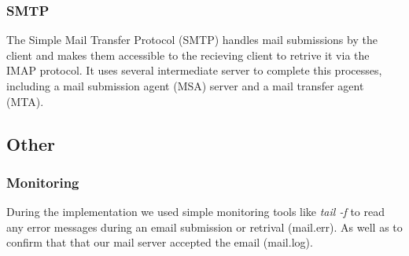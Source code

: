 \subsubsection{SMTP}
The Simple Mail Transfer Protocol (SMTP) handles mail submissions by the
client and makes them accessible to the recieving client to retrive it
via the IMAP protocol. It uses several intermediate server to complete
this processes, including a mail submission agent (MSA) server and a
mail transfer agent (MTA).
\subsection{Other}
\subsubsection{Monitoring}
During the implementation we used simple monitoring tools like \emph{tail -f} 
to read any error messages during an email submission or retrival (mail.err). 
As well as to confirm that that our mail server accepted the email (mail.log).\\


